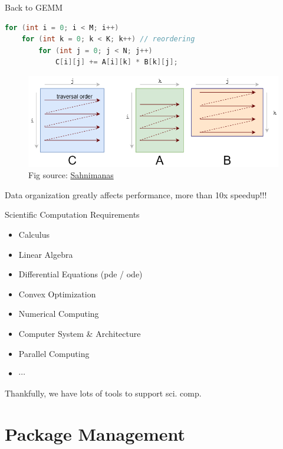 \documentclass{../TexTemplate/myslide}
\begin{document}
\begin{frame}[fragile]{Back to GEMM}
\begin{lstlisting}[language=c++]
for (int i = 0; i < M; i++)
    for (int k = 0; k < K; k++) // reordering
        for (int j = 0; j < N; j++)
            C[i][j] += A[i][k] * B[k][j];
\end{lstlisting}
\begin{figure}
\centering
\includegraphics[width=0.75\linewidth]{fig/reordering.png}
\caption*{\scriptsize Fig source: \href{https://sahnimanas.github.io/post/anatomy-of-a-high-performance-convolution/img/reordered.svg}{Sahnimanas}}
\end{figure}
Data organization greatly affects performance, more than 10x speedup!!!
\end{frame}

\begin{frame}{Scientific Computation Requirements}
\begin{itemize}
	\item Calculus
	\item Linear Algebra
	\item Differential Equations (pde / ode)
	\item Convex Optimization
	\item Numerical Computing
	\item Computer System \& Architecture
	\item Parallel Computing
	\item $\cdots$
\end{itemize}
\pause
Thankfully, we have lots of tools to support sci. comp.
\end{frame}

\section{Package Management}
\begin{frame}
\sectionpage
\end{frame}
\end{document}
